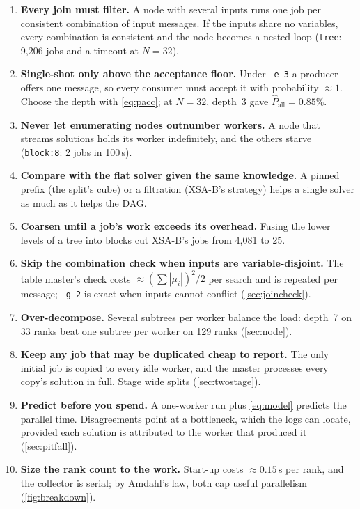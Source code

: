 \documentclass[11pt,a4paper]{article}
\newcommand{\XSAB}{\textsf{XSA-B}}
\newcommand{\dfam}[1]{\texttt{#1}}
\newcommand{\opt}[1]{\texttt{#1}}
\newcommand{\Pall}{\widehat{P}_{\mathrm{all}}}
\begin{document}
\begin{enumerate}[label=\textbf{R\arabic*.}, leftmargin=2.6em]
\item \textbf{Every join must filter.} A node with several inputs runs one job per
      consistent combination of input messages. If the inputs share no variables, every
      combination is consistent and the node becomes a nested loop (\dfam{tree}: 9{,}206
      jobs and a timeout at $N=32$).
\item \textbf{Single-shot only above the acceptance floor.} Under \opt{-e 3} a producer
      offers one message, so every consumer must accept it with probability $\approx 1$.
      Choose the depth with \cref{eq:pacc}; at $N=32$, depth~3 gave $\Pall=0.85\%$.
\item \textbf{Never let enumerating nodes outnumber workers.} A node that streams
      solutions holds its worker indefinitely, and the others starve (\dfam{block:8}: 2
      jobs in 100\,s).
\item \textbf{Compare with the flat solver given the same knowledge.} A pinned prefix (the
      split's cube) or a filtration (\XSAB{}'s strategy) helps a single solver as much as
      it helps the DAG.
\item \textbf{Coarsen until a job's work exceeds its overhead.} Fusing the lower levels of
      a tree into blocks cut \XSAB{}'s jobs from 4{,}081 to 25.
\item \textbf{Skip the combination check when inputs are variable-disjoint.} The table
      master's check costs $\approx(\sum|\mu_i|)^2/2$ per search and is repeated per
      message; \opt{-g 2} is exact when inputs cannot conflict (\cref{sec:joincheck}).
\item \textbf{Over-decompose.} Several subtrees per worker balance the load: depth~7 on 33
      ranks beat one subtree per worker on 129 ranks (\cref{sec:node}).
\item \textbf{Keep any job that may be duplicated cheap to report.} The only initial job is
      copied to every idle worker, and the master processes every copy's solution in full.
      Stage wide splits (\cref{sec:twostage}).
\item \textbf{Predict before you spend.} A one-worker run plus \cref{eq:model} predicts
      the parallel time. Disagreements point at a bottleneck, which the logs can locate,
      provided each solution is attributed to the worker that produced it
      (\cref{sec:pitfall}).
\item \textbf{Size the rank count to the work.} Start-up costs $\approx0.15$\,s per rank,
      and the collector is serial; by Amdahl's law, both cap useful parallelism
      (\cref{fig:breakdown}).
\end{enumerate}
\end{document}

